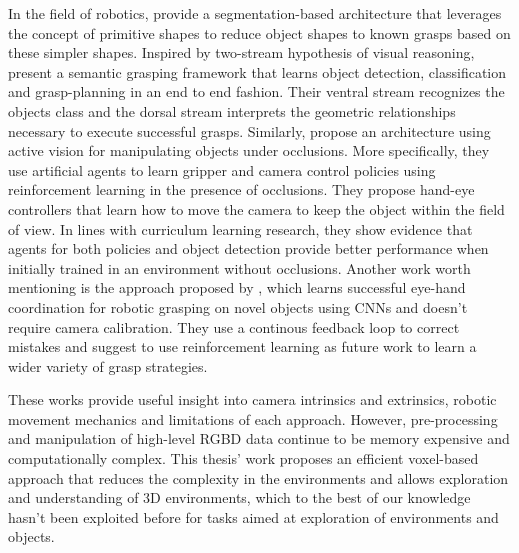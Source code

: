 In the field of robotics, 
\textcite{lin2020using} provide a segmentation-based architecture that leverages the concept of primitive shapes to reduce object shapes to known grasps based on these simpler shapes. 
Inspired by two-stream hypothesis of visual reasoning, \textcite{jang2017end} present a semantic grasping framework that learns object detection, classification and grasp-planning in an end to end fashion. Their ventral stream recognizes the objects class and the dorsal stream interprets the geometric relationships necessary to execute successful grasps.
Similarly, \textcite{cheng2018reinforcement} propose an architecture using active vision for manipulating objects under occlusions. More specifically, they use artificial agents to learn gripper and camera control policies using reinforcement learning in the presence of occlusions. They propose hand-eye controllers that learn how to move the camera to keep the object within the field of view. In lines with curriculum learning research, they show evidence that agents for both policies and object detection provide better performance when initially trained in an environment without occlusions.
Another work worth mentioning is the approach proposed by \textcite{levine2018learning}, which learns successful eye-hand coordination for robotic grasping on novel objects using CNNs and doesn't require camera calibration. They use a continous feedback loop to correct mistakes and suggest to use reinforcement learning as future work to learn a wider variety of grasp strategies. 

These works provide useful insight into camera intrinsics and extrinsics, robotic movement mechanics and limitations of each approach. However, pre-processing and manipulation of high-level RGBD data continue to be memory expensive and computationally complex. This thesis' work proposes an efficient voxel-based approach that reduces the complexity in the environments and allows exploration and understanding of 3D environments, which to the best of our knowledge hasn't been exploited before for tasks aimed at exploration of environments and objects.

